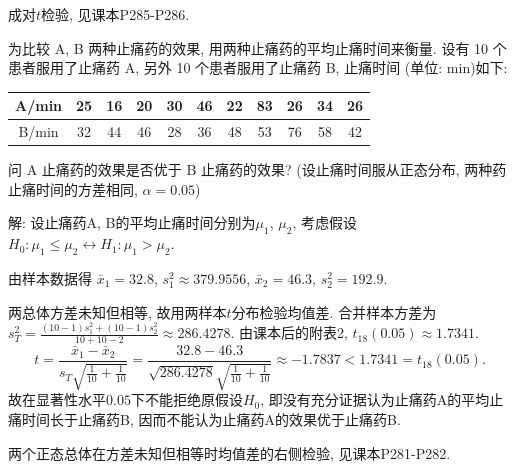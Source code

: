 \documentclass[standard]{ExBook}
\renewenvironment{shaded}{%
  \def\FrameCommand{\fboxsep=\FrameSep \colorbox{shadecolor}}%
  \MakeFramed{\advance\hsize-\width \FrameRestore}%
}{%
  \endMakeFramed
}
\begin{document}
\begin{qitems}
\textcolor{themeColor}{\selectfont {} 成对$t$检验, 见课本P285-P286.}

\vspace{2.5cm-5em}

    \begin{bbox}
    \begin{shaded}
        \qitem
为比较 A, B 两种止痛药的效果, 用两种止痛药的平均止痛时间来衡量. 设有 10 个患者服用了止痛药 A, 另外 10 个患者服用了止痛药 B, 止痛时间 (单位: min)如下:
\begin{center}
\setlength{\tabcolsep}{14pt}
\begin{tabular}{c|cccccccccc}
\hline
A/min & 25 & 16 & 20 & 30 & 46 & 22 & 83 & 26 & 34 & 26 \\
\hline
B/min & 32 & 44 & 46 & 28 & 36 & 48 & 53 & 76 & 58 & 42 \\
\hline
\end{tabular}
\end{center}
问 A 止痛药的效果是否优于 B 止痛药的效果? (设止痛时间服从正态分布, 两种药止痛时间的方差相同, $\alpha = 0.05$)
    \end{shaded}
    \end{bbox}

\vspace{\dimexpr2.5cm-5em\relax}

解: 设止痛药A, B的平均止痛时间分别为$\mu_1$, $\mu_2$, 考虑假设
$
H_0:\mu_1\leq\mu_2
\longleftrightarrow
H_1:\mu_1>\mu_2
$.

由样本数据得
$
\bar{x}_1=32.8
$,
$
s_1^2\approx379.9556
$,
$
\bar{x}_2=46.3
$,
$
s_2^2=192.9
$.

两总体方差未知但相等, 故用两样本$t$分布检验均值差. 合并样本方差为
$
s_T^2
=\frac{(10-1)s_1^2+(10-1)s_2^2}{10+10-2}
\approx286.4278
$.
由课本后的附表2, $t_{18}(0.05)\approx1.7341$.
$$
t
=
\frac{\bar{x}_1-\bar{x}_2}
{s_T\sqrt{\frac{1}{10}+\frac{1}{10}}}
=
\frac{32.8-46.3}
{\sqrt{286.4278}\sqrt{\frac{1}{10}+\frac{1}{10}}}
\approx-1.7837
<
1.7341
=
t_{18}(0.05).
$$
故在显著性水平$0.05$下不能拒绝原假设$H_0$, 即没有充分证据认为止痛药A的平均止痛时间长于止痛药B, 因而不能认为止痛药A的效果优于止痛药B.

\textcolor{themeColor}{\selectfont {} 两个正态总体在方差未知但相等时均值差的右侧检验, 见课本P281-P282.}

\vspace{2.5cm-5em}


\end{qitems}
\end{document}
